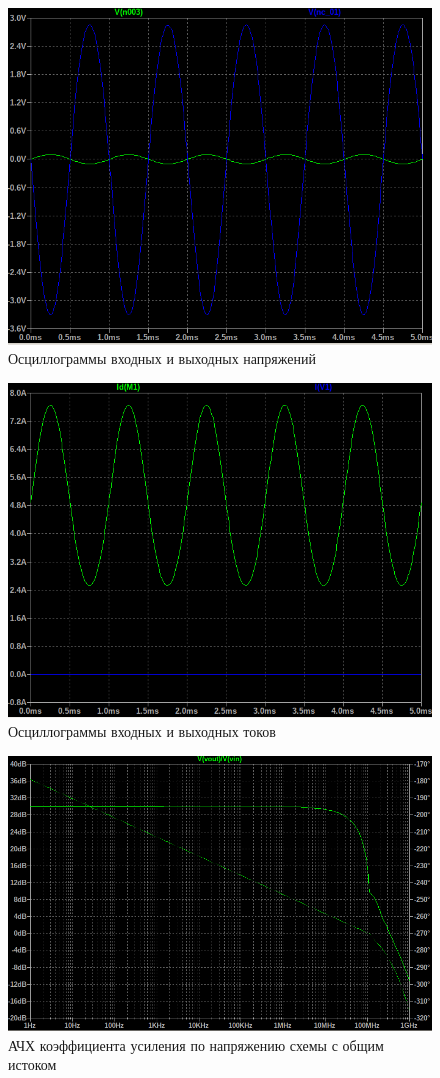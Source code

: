 \begin{figure}[H]
    \centering
    \includegraphics[width=0.8\linewidth]{figs/гарм.png}
    \caption{Осциллограммы входных и выходных напряжений}
    \label{fig:гарм}
\end{figure}

\begin{figure}[H]
    \centering
    \includegraphics[width=0.8\linewidth]{figs/гарм_ток.png}
    \caption{Осциллограммы входных и выходных токов}
    \label{fig:гарм_ток}
\end{figure}

\begin{figure}[H]
    \centering
    \includegraphics[width=0.8\linewidth]{figs/ачх.png}
    \caption{АЧХ коэффициента усиления по напряжению схемы с общим истоком}
    \label{fig:ачх}
\end{figure}


